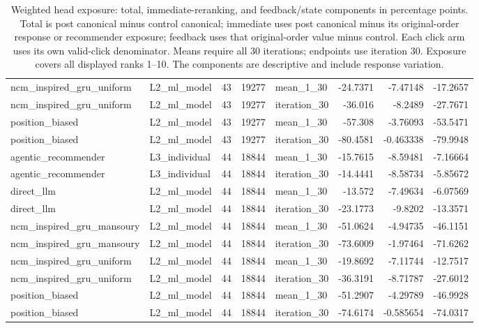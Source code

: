 \begin{table}[htbp!]
\begin{tabular}{llrrlrrr}
ncm\_inspired\_gru\_uniform & L2\_ml\_model & 43 & 19277 & mean\_1\_30 & -24.7371 & -7.47148 & -17.2657 \\
ncm\_inspired\_gru\_uniform & L2\_ml\_model & 43 & 19277 & iteration\_30 & -36.016 & -8.2489 & -27.7671 \\
position\_biased & L2\_ml\_model & 43 & 19277 & mean\_1\_30 & -57.308 & -3.76093 & -53.5471 \\
position\_biased & L2\_ml\_model & 43 & 19277 & iteration\_30 & -80.4581 & -0.463338 & -79.9948 \\
agentic\_recommender & L3\_individual & 44 & 18844 & mean\_1\_30 & -15.7615 & -8.59481 & -7.16664 \\
agentic\_recommender & L3\_individual & 44 & 18844 & iteration\_30 & -14.4441 & -8.58734 & -5.85672 \\
direct\_llm & L2\_ml\_model & 44 & 18844 & mean\_1\_30 & -13.572 & -7.49634 & -6.07569 \\
direct\_llm & L2\_ml\_model & 44 & 18844 & iteration\_30 & -23.1773 & -9.8202 & -13.3571 \\
ncm\_inspired\_gru\_mansoury & L2\_ml\_model & 44 & 18844 & mean\_1\_30 & -51.0624 & -4.94735 & -46.1151 \\
ncm\_inspired\_gru\_mansoury & L2\_ml\_model & 44 & 18844 & iteration\_30 & -73.6009 & -1.97464 & -71.6262 \\
ncm\_inspired\_gru\_uniform & L2\_ml\_model & 44 & 18844 & mean\_1\_30 & -19.8692 & -7.11744 & -12.7517 \\
ncm\_inspired\_gru\_uniform & L2\_ml\_model & 44 & 18844 & iteration\_30 & -36.3191 & -8.71787 & -27.6012 \\
position\_biased & L2\_ml\_model & 44 & 18844 & mean\_1\_30 & -51.2907 & -4.29789 & -46.9928 \\
position\_biased & L2\_ml\_model & 44 & 18844 & iteration\_30 & -74.6174 & -0.585654 & -74.0317 \\
\hline
\end{tabular}
\caption{Weighted head exposure: total, immediate-reranking, and feedback/state components in percentage points. Total is post canonical minus control canonical; immediate uses post canonical minus its original-order response or recommender exposure; feedback uses that original-order value minus control. Each click arm uses its own valid-click denominator. Means require all 30 iterations; endpoints use iteration 30. Exposure covers all displayed ranks 1--10. The components are descriptive and include response variation.}
\label{chap:results:tab:rq4_post_processing_weighted_head_exposure_components}
\end{table}
